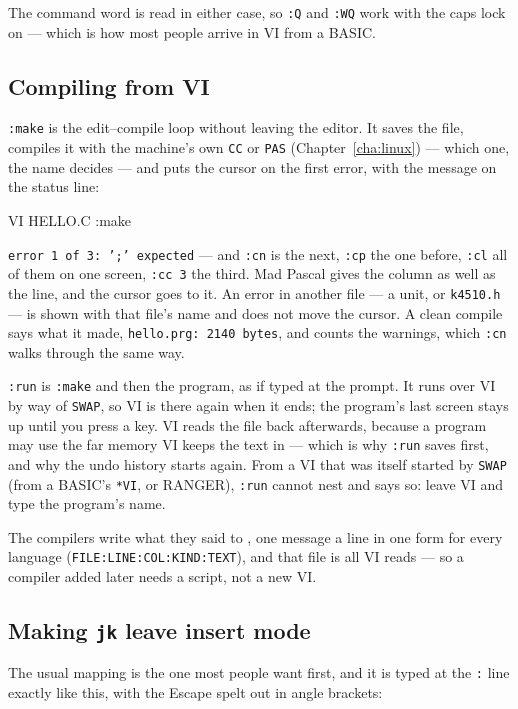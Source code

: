 \noindent The command word is read in either case, so \verb|:Q| and
\verb|:WQ| work with the caps lock on --- which is how most people
arrive in VI from a BASIC.

\subsection*{Compiling from VI}
\verb|:make| is the edit--compile loop without leaving the editor. It saves
the file, compiles it with the machine's own \verb|CC| or \verb|PAS|
(Chapter~\ref{cha:linux}) --- which one, the name decides --- and puts
the cursor on the first error, with the message on the status line:

\begin{type}
VI HELLO.C
:make
\end{type}

\noindent \texttt{error 1 of 3: ';' expected} --- and \verb|:cn| is the
next, \verb|:cp| the one before, \verb|:cl| all of them on one screen,
\verb|:cc 3| the third. Mad Pascal gives the column as well as the line,
and the cursor goes to it. An error in another file --- a unit, or
\texttt{k4510.h} --- is shown with that file's name and does not move the
cursor. A clean compile says what it made, \texttt{hello.prg: 2140 bytes},
and counts the warnings, which \verb|:cn| walks through the same way.

\verb|:run| is \verb|:make| and then the program, as if typed at the
prompt. It runs over VI by way of \verb|SWAP|, so VI is there again when
it ends; the program's last screen stays up until you press a key. VI
reads the file back afterwards, because a program may use the far memory
VI keeps the text in --- which is why \verb|:run| saves first, and why the
undo history starts again. From a VI that was itself started by
\verb|SWAP| (from a BASIC's \verb|*VI|, or RANGER), \verb|:run| cannot
nest and says so: leave VI and type the program's name.

The compilers write what they said to , one
message a line in one form for every language (\texttt{FILE:LINE:COL:KIND:TEXT}),
and that file is all VI reads --- so a compiler added later needs a
script, not a new VI.

\subsection*{Making \texttt{jk} leave insert mode}
The usual mapping is the one most people want first, and it is typed at
the \verb|:| line exactly like this, with the Escape spelt out in angle
brackets:

